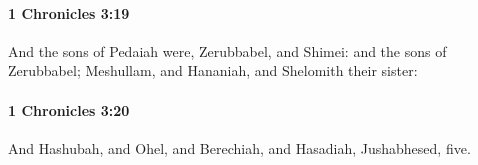 		\paragraph{1 Chronicles 3:19} %
			\label{1CHRONICLES-3-19}

			And the sons of Pedaiah were, Zerubbabel, and Shimei: and the sons of Zerubbabel; Meshullam, and Hananiah, and Shelomith their sister:


		\paragraph{1 Chronicles 3:20} %
			\label{1CHRONICLES-3-20}

			And Hashubah, and Ohel, and Berechiah, and Hasadiah, Jushabhesed, five.



